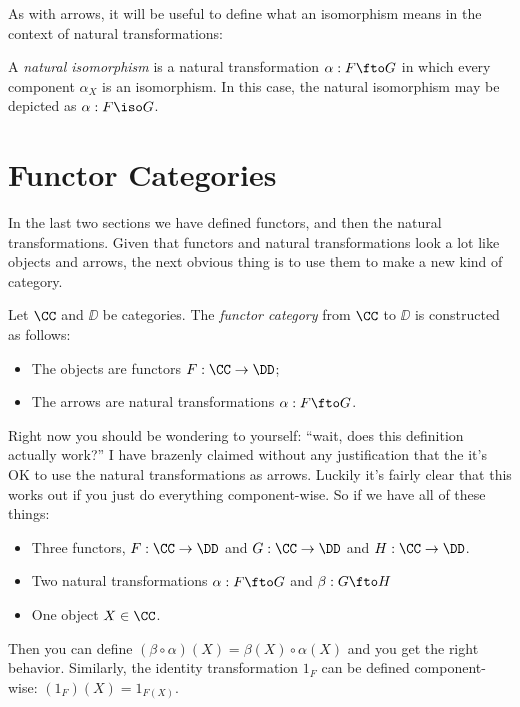 As with arrows, it will be useful to define what an isomorphism means in the context of
natural transformations:

\begin{defn}
A {\it natural isomorphism} is a natural transformation $\alpha: F \fto G$ in which every
component $\alpha_X$ is an isomorphism. In this case, the natural isomorphism may be
depicted as $\alpha: F \iso G$.
\end{defn}

\section{Functor Categories}

In the last two sections we have defined functors, and then the natural
transformations. Given that functors and natural transformations look a lot like objects and arrows,
the next obvious thing is to use them to make a new kind of category.

\goodbreak
\begin{defn}
 Let $\CC$ and $\DD$ be categories. The \emph{functor category} from $\CC$ to $\DD$ is
 constructed as follows:
 \begin{itemize}
  \item The objects are functors $F: \CC \to \DD$;
  \item The arrows are natural transformations $\alpha:F\fto G$.
 \end{itemize}
\end{defn}
\noindent
Right now you should be wondering to yourself: ``wait, does this definition actually
work?'' I have brazenly claimed without any justification that the it's OK to use the
natural transformations as arrows. Luckily it's fairly clear that this works out if you
just do everything component-wise. So if we have all of these things: 
\begin{itemize}
\item Three functors, $F: \CC \to \DD$ and $G: \CC \to \DD$ and $H:\CC \to \DD$.

\item Two natural transformations $\alpha: F \fto G$ and $\beta: G \fto H$

\item One object $X \in \CC$.
\end{itemize}
\noindent
Then you can define $(\beta \circ \alpha)(X) = \beta(X) \circ \alpha(X)$ and you get the
right behavior. Similarly, the identity transformation $1_F$ can be defined
component-wise: $(1_F)(X) = 1_{F(X)}$.

